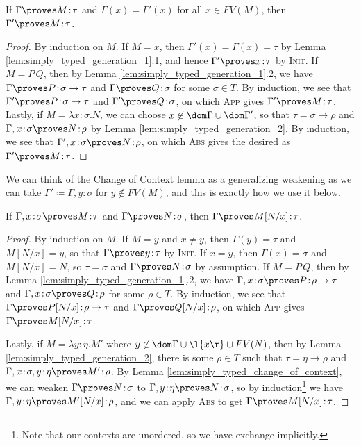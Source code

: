 \documentclass[reqno]{amsart}
\begin{document}
    \begin{lemma}\label{lem:simply_typed_change_of_context}
        If $\Gamma\proves M\!:\!\tau$ and $\Gamma(x)=\Gamma'(x)$ for all $x\in FV(M)$, then $\Gamma'\proves M\!:\!\tau$.
    \end{lemma}
    \begin{proof}
        By induction on $M$. If $M=x$, then $\Gamma'(x)=\Gamma(x)=\tau$ by Lemma \ref{lem:simply_typed_generation_1}.1, and hence $\Gamma'\proves x\!:\!\tau$ by \textsc{Init}. If $M=P\,Q$, then by Lemma \ref{lem:simply_typed_generation_1}.2, we have $\Gamma\proves P\!:\!\sigma\rightarrow\tau$ and $\Gamma\proves Q\!:\!\sigma$ for some $\sigma\in T$. By induction, we see that $\Gamma'\proves P\!:\!\sigma\to\tau$ and $\Gamma'\proves Q\!:\!\sigma$, on which \textsc{App} gives $\Gamma'\proves M\!:\!\tau$. Lastly, if $M=\lambda x\!:\!\sigma.N$, we can choose $x\not\in\dom\Gamma\cup\dom\Gamma'$, so that $\tau=\sigma\rightarrow\rho$ and $\Gamma,x\!:\!\sigma\proves N\!:\!\rho$ by Lemma \ref{lem:simply_typed_generation_2}. By induction, we see that $\Gamma',x\!:\!\sigma\proves N\!:\!\rho$, on which \textsc{Abs} gives the desired as $\Gamma'\proves M\!:\!\tau$.
    \end{proof}

    We can think of the Change of Context lemma as a generalizing weakening as we can take $\Gamma'\coloneqq\Gamma,y\!:\!\sigma$ for $y\not\in FV(M)$, and this is exactly how we use it below.

    \begin{lemma}\label{lem:simply_typed_substitution}
        If $\Gamma,x\!:\!\sigma\proves M\!:\!\tau$ and $\Gamma\proves N\!:\!\sigma$, then $\Gamma\proves M[N/x]\!:\!\tau$.
    \end{lemma}
    \begin{proof}
        By induction on $M$. If $M=y$ and $x\neq y$, then $\Gamma(y)=\tau$ and $M[N/x]=y$, so that $\Gamma\proves y\!:\!\tau$ by \textsc{Init}. If $x=y$, then $\Gamma(x)=\sigma$ and $M[N/x]=N$, so $\tau=\sigma$ and $\Gamma\proves N\!:\!\sigma$ by assumption. If $M=P\,Q$, then by Lemma \ref{lem:simply_typed_generation_1}.2, we have $\Gamma,x\!:\!\sigma\proves P\!:\!\rho\rightarrow\tau$ and $\Gamma,x\!:\!\sigma\proves Q\!:\!\rho$ for some $\rho\in T$. By induction, we see that $\Gamma\proves P[N/x]\!:\!\rho\to\tau$ and $\Gamma\proves Q[N/x]\!:\!\rho$, on which \textsc{App} gives $\Gamma\proves M[N/x]\!:\!\tau$.

        Lastly, if $M=\lambda y\!:\!\eta.M'$ where $y\not\in\dom\Gamma\cup\l\{x\r\}\cup FV(N)$, then by Lemma \ref{lem:simply_typed_generation_2}, there is some $\rho\in T$ such that $\tau=\eta\rightarrow\rho$ and $\Gamma,x\!:\!\sigma,y\!:\!\eta\proves M'\!:\!\rho$. By Lemma \ref{lem:simply_typed_change_of_context}, we can weaken $\Gamma\proves N\!:\!\sigma$ to $\Gamma,y\!:\!\eta\proves N\!:\!\sigma$, so by induction\footnote{Note that our contexts are unordered, so we have exchange implicitly.} we have $\Gamma,y\!:\!\eta\proves M'[N/x]\!:\!\rho$, and we can apply \textsc{Abs} to get $\Gamma\proves M[N/x]\!:\!\tau$.
    \end{proof}
\end{document}
